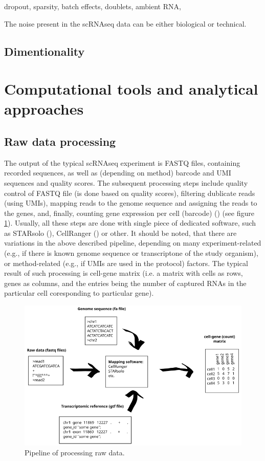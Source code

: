 dropout, sparsity, batch effects, doublets, ambient RNA,

The noise present in the scRNAseq data can be either biological or technical.

\subsection{Dimentionality}

\section{Computational tools and analytical approaches}

\subsection{Raw data processing}

The output of the typical scRNAseq experiment is FASTQ files, containing recorded sequences,
as well as (depending on method) barcode and UMI sequences and quality scores.
The subsequent processing steps include quality control of FASTQ file (is done based on quality scores),
filtering dublicate reads (using UMIs), mapping reads to the genome sequence and assigning the reads to the genes,
and, finally, counting gene expression per cell (barcode) (\cite{Heumos2023}) (see figure \ref{fig:rawData}).
Usually, all these steps are done with single piece of dedicated software,
such as STARsolo (\cite{Kaminow2021}), CellRanger (\cite{Zheng2017}) or other.
It should be noted, that there are variations in the above described pipeline,
depending on many experiment-related (e.g., if there is known genome sequence or transcriptone of the study organism),
or method-related (e.g., if UMIs are used in the protocol) factors.
The typical result of such processing is cell-gene matrix (i.e. a matrix with cells as rows, genes as columns,
and the entries being the number of captured RNAs in the particular cell coresponding to particular gene).

\begin{figure}
  \centering
  \includegraphics[width=\linewidth]{images/rawdata.png}
  \caption{Pipeline of processing raw data.}
  \label{fig:rawData}
\end{figure}

